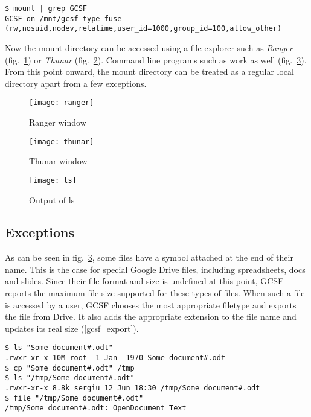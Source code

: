 \begin{lstlisting}[caption=Output of mount, frame=single, label=mount_output]
$ mount | grep GCSF
GCSF on /mnt/gcsf type fuse (rw,nosuid,nodev,relatime,user_id=1000,group_id=100,allow_other)
\end{lstlisting}


Now the mount directory can be accessed using a file explorer such as \emph{Ranger} (fig.~\ref{fig:ranger}) or \emph{Thunar} (fig.~\ref{fig:thunar}). Command line programs such as  work as well (fig.~\ref{fig:ls}). From this point onward, the mount directory can be treated as a regular local directory apart from a few exceptions.

\begin{figure}[tbp]
\caption{Ranger window}
\label{fig:ranger}
\centering
\texttt{[image: ranger]}
\end{figure}

\begin{figure}[tbp]
\caption{Thunar window}
\label{fig:thunar}
\centering
\texttt{[image: thunar]}
\end{figure}

\begin{figure}[tbp]
\caption{Output of ls}
\label{fig:ls}
\centering
\texttt{[image: ls]}
\end{figure}

\subsection{Exceptions}

As can be seen in fig.~\ref{fig:ls}, some files have a \codeword{#} symbol attached at the end of their name. This is the case for special Google Drive files, including spreadsheets, docs and slides. Since their file format and size is undefined at this point, GCSF reports the maximum file size supported for these types of files. When such a file is accessed by a user, GCSF chooses the most appropriate filetype and exports the file from Drive. It also adds the appropriate extension to the file name and updates its real size (\ref{gcsf_export}).

\begin{lstlisting}[caption=Exporting Google Drive documents, frame=single, label=gcsf_export]
$ ls "Some document#.odt"
.rwxr-xr-x 10M root  1 Jan  1970 Some document#.odt
$ cp "Some document#.odt" /tmp
$ ls "/tmp/Some document#.odt"
.rwxr-xr-x 8.8k sergiu 12 Jun 18:30 /tmp/Some document#.odt
$ file "/tmp/Some document#.odt"
/tmp/Some document#.odt: OpenDocument Text
\end{lstlisting}





